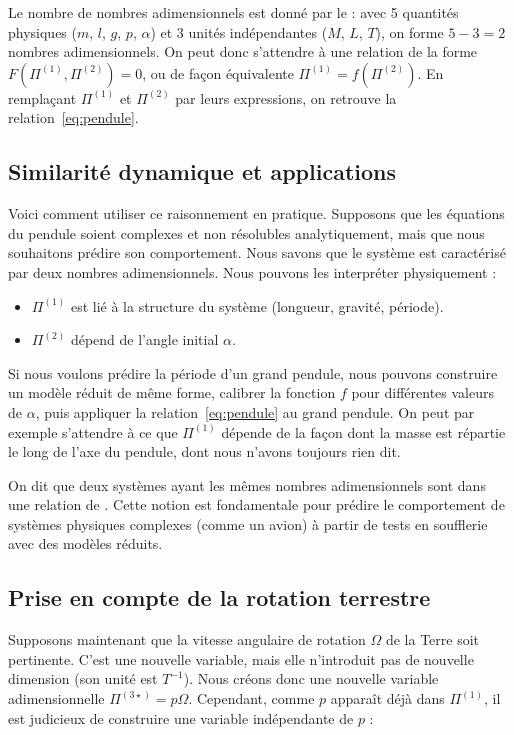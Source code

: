 Le nombre de nombres adimensionnels est donné par le  : avec 5 quantités physiques ($m$, $l$, $g$, $p$, $\alpha$) et 3 unités indépendantes ($M$, $L$, $T$), on forme $5-3 = 2$ nombres adimensionnels. On peut donc s’attendre à une relation de la forme $F(\Pi^{(1)}, \Pi^{(2)}) = 0$, ou de façon équivalente $\Pi^{(1)} = f(\Pi^{(2)})$. En remplaçant $\Pi^{(1)}$ et $\Pi^{(2)}$ par leurs expressions, on retrouve la relation~\eqref{eq:pendule}.

\subsection{Similarité dynamique et applications}
Voici comment utiliser ce raisonnement en pratique. Supposons que les équations du pendule soient complexes et non résolubles analytiquement, mais que nous souhaitons prédire son comportement. Nous savons que le système est caractérisé par deux nombres adimensionnels. Nous pouvons les interpréter physiquement :
\begin{itemize}
  \item $\Pi^{(1)}$ est lié à la structure du système (longueur, gravité, période).
  \item $\Pi^{(2)}$ dépend de l’angle initial $\alpha$.
\end{itemize}

Si nous voulons prédire la période d’un grand pendule, nous pouvons construire un modèle réduit de même forme, calibrer la fonction $f$ pour différentes valeurs de $\alpha$, puis appliquer la relation~\eqref{eq:pendule} au grand pendule. On peut par exemple s'attendre à ce que $\Pi^{(1)}$ dépende de la façon dont la masse est répartie le long de l'axe du pendule, dont nous n'avons toujours rien dit. 

On dit que deux systèmes ayant les mêmes nombres adimensionnels sont dans une relation de . Cette notion est fondamentale pour prédire le comportement de systèmes physiques complexes (comme un avion) à partir de tests en soufflerie avec des modèles réduits.

\subsection{Prise en compte de la rotation terrestre}
Supposons maintenant que la vitesse angulaire de rotation $\Omega$ de la Terre soit pertinente. C’est une nouvelle variable, mais elle n’introduit pas de nouvelle dimension (son unité est $T^{-1}$). Nous créons donc une nouvelle variable adimensionnelle $\Pi^{(3\star)} = p\Omega$. Cependant, comme $p$ apparaît déjà dans $\Pi^{(1)}$, il est judicieux de construire une variable indépendante de $p$ :

